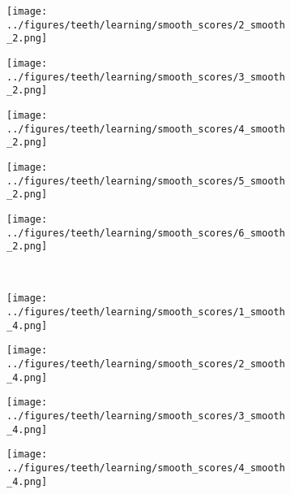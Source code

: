 \begin{figure}[h!]
\begin{subfigure}{0.15\textwidth}
		\label{fig:1}
	\end{subfigure}
	\begin{subfigure}{0.15\textwidth}
		\centering
		\texttt{[image: ../figures/teeth/learning/smooth\_scores/2\_smooth\_2.png]}
		\label{fig:1}
	\end{subfigure}
	\begin{subfigure}{0.15\textwidth}
		\centering
		\texttt{[image: ../figures/teeth/learning/smooth\_scores/3\_smooth\_2.png]}
		\label{fig:1}
	\end{subfigure}
	\begin{subfigure}{0.15\textwidth}
		\centering
		\texttt{[image: ../figures/teeth/learning/smooth\_scores/4\_smooth\_2.png]}
		\label{fig:1}
	\end{subfigure}
	\begin{subfigure}{0.15\textwidth}
		\centering
		\texttt{[image: ../figures/teeth/learning/smooth\_scores/5\_smooth\_2.png]}
		\label{fig:1}
	\end{subfigure}
	\begin{subfigure}{0.15\textwidth}
		\centering
		\texttt{[image: ../figures/teeth/learning/smooth\_scores/6\_smooth\_2.png]}
		\label{fig:1}
	\end{subfigure}
	\vspace{-0.35cm}
	\\
	\begin{subfigure}[b]{0.03\textwidth} %
		\centering
	\end{subfigure}
	\begin{subfigure}{0.15\textwidth}
		\centering
		\texttt{[image: ../figures/teeth/learning/smooth\_scores/1\_smooth\_4.png]}
		\label{fig:1}
	\end{subfigure}
	\begin{subfigure}{0.15\textwidth}
		\centering
		\texttt{[image: ../figures/teeth/learning/smooth\_scores/2\_smooth\_4.png]}
		\label{fig:1}
	\end{subfigure}
	\begin{subfigure}{0.15\textwidth}
		\centering
		\texttt{[image: ../figures/teeth/learning/smooth\_scores/3\_smooth\_4.png]}
		\label{fig:1}
	\end{subfigure}
	\begin{subfigure}{0.15\textwidth}
		\centering
		\texttt{[image: ../figures/teeth/learning/smooth\_scores/4\_smooth\_4.png]}

\end{subfigure}
\end{figure}
